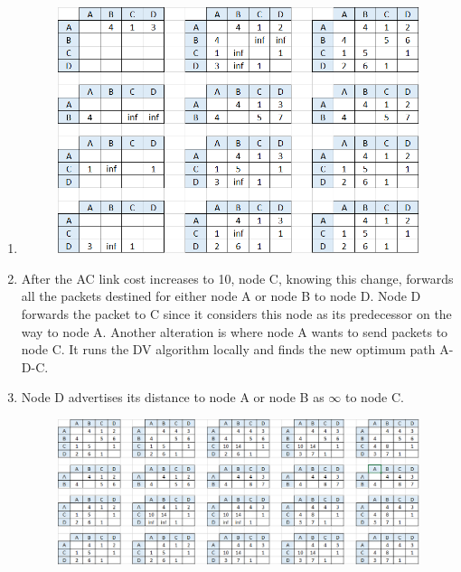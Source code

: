 \documentclass[10pt,letterpaper]{article}
\begin{document}
\begin{enumerate}[label=\alph*-]
\item
\begin{figure}[htbp]
\centering
\includegraphics[width=110mm]{DV.png}
\end{figure}
\item
After the AC link cost increases to 10, node C, knowing this change, forwards all the packets destined for either node A or node B to node D. Node D forwards the packet to C since it considers this node as its predecessor on the way to node A. Another alteration is where node A wants to send packets to node C. It runs the DV algorithm locally and finds the new optimum path A-D-C.
\item
Node D advertises its distance to node A or node B as $\infty$ to node C.
\begin{figure}[htbp]
\centering
\includegraphics[width=140mm]{DV_PR.png}
\end{figure}
\end{enumerate}
\end{document}
